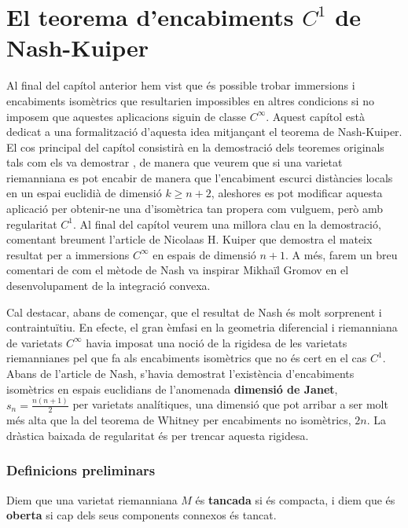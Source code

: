 \chapter{El teorema d'encabiments $C^1$ de Nash-Kuiper}\label{chap:capitol_nash}

Al final del capítol anterior hem vist que és possible trobar immersions i encabiments isomètrics que resultarien impossibles en altres condicions si no imposem que aquestes aplicacions siguin de classe $C^\infty$. Aquest capítol està dedicat a una formalització d'aquesta idea mitjançant el teorema de Nash-Kuiper. El cos principal del capítol consistirà en la demostració dels teoremes originals tals com els va demostrar \citet{nash1954}, de manera que veurem que si una varietat riemanniana es pot encabir de manera que l'encabiment escurci distàncies locals en un espai euclidià de dimensió $k\ge n+2$, aleshores es pot modificar aquesta aplicació per obtenir-ne una d'isomètrica tan propera com vulguem, però amb regularitat $C^1$. Al final del capítol veurem una millora clau en la demostració, comentant breument l'article de Nicolaas H. Kuiper \cite{kuiper1955} que demostra el mateix resultat per a immersions $C^\infty$ en espais de dimensió $n+1$. A més, farem un breu comentari de com el mètode de Nash va inspirar Mikhaïl Gromov en el desenvolupament de la integració convexa. 

Cal destacar, abans de començar, que el resultat de Nash és molt sorprenent i contraintuïtiu. En efecte, el gran èmfasi en la geometria diferencial i riemanniana de varietats $C^\infty$ havia imposat una noció de la rigidesa de les varietats riemannianes pel que fa als encabiments isomètrics que no és cert en el cas $C^1$. Abans de l'article de Nash, s'havia demostrat l'existència d'encabiments isomètrics en espais euclidians de l'anomenada \textbf{dimensió de Janet}, $s_n = \frac{n(n+1)}{2}$ per varietats analítiques, una dimensió que pot arribar a ser molt més alta que la del teorema de Whitney per encabiments no isomètrics, $2n$. La dràstica baixada de regularitat és  per trencar aquesta rigidesa.
\\

\subsection{Definicions preliminars}
\begin{defi}
    Diem que una varietat riemanniana $M$ és \textbf{tancada} si és compacta, i diem que és \textbf{oberta} si cap dels seus components connexos és tancat.
\end{defi}

